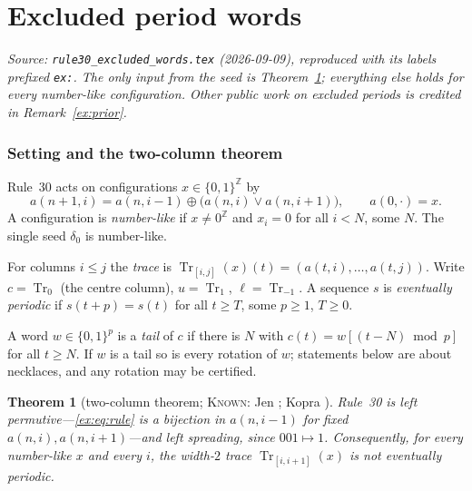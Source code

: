 \documentclass[11pt]{article}
\newtheorem{theorem}{Theorem}[section]
\theoremstyle{definition}
\theoremstyle{remark}
\newcommand{\Tr}{\operatorname{Tr}}
\newcommand{\Z}{\mathbb{Z}}
\newcommand{\KNOWN}{\textsc{Known}}
\begin{document}
\part{Excluded period words}

\noindent\emph{Source: \texttt{rule30\_excluded\_words.tex} (2026-09-09), reproduced with its labels prefixed \texttt{ex:}. The only input from the seed is Theorem~\ref{ex:thm:zero}; everything else holds for every number-like configuration. Other public work on excluded periods is credited in Remark~\ref{ex:prior}.}

\section{Setting and the two-column theorem}\label{ex:setting}

Rule~30 acts on configurations $x\in\{0,1\}^{\Z}$ by
\begin{equation}\label{ex:eq:rule}
a(n+1,i)=a(n,i-1)\oplus\bigl(a(n,i)\vee a(n,i+1)\bigr),\qquad a(0,\cdot)=x .
\end{equation}
A configuration is \emph{number-like} \cite[Def.~2.4]{Kopra} if $x\ne 0^{\Z}$ and $x_i=0$ for all $i<N$, some $N$. The single seed $\delta_0$ is number-like.

For columns $i\le j$ the \emph{trace} is $\Tr_{[i,j]}(x)(t)=(a(t,i),\dots,a(t,j))$. Write $c=\Tr_0$ (the centre column), $u=\Tr_1$, $\ell=\Tr_{-1}$. A sequence $s$ is \emph{eventually periodic} if $s(t+p)=s(t)$ for all $t\ge T$, some $p\ge1$, $T\ge0$.

A word $w\in\{0,1\}^p$ is a \emph{tail} of $c$ if there is $N$ with $c(t)=w[(t-N)\bmod p]$ for all $t\ge N$. If $w$ is a tail so is every rotation of $w$; statements below are about necklaces, and any rotation may be certified.

\begin{theorem}[two-column theorem; \KNOWN: Jen \cite{Jen86,Jen90}; Kopra {\cite[Thm.~3.5]{Kopra}}]\label{ex:thm:zero}
Rule~30 is left permutive---\eqref{ex:eq:rule} is a bijection in $a(n,i-1)$ for fixed $a(n,i),a(n,i+1)$---and left spreading, since $001\mapsto1$. Consequently, for every number-like $x$ and every $i$, the width-$2$ trace $\Tr_{[i,i+1]}(x)$ is not eventually periodic.
\end{theorem}
\end{document}
